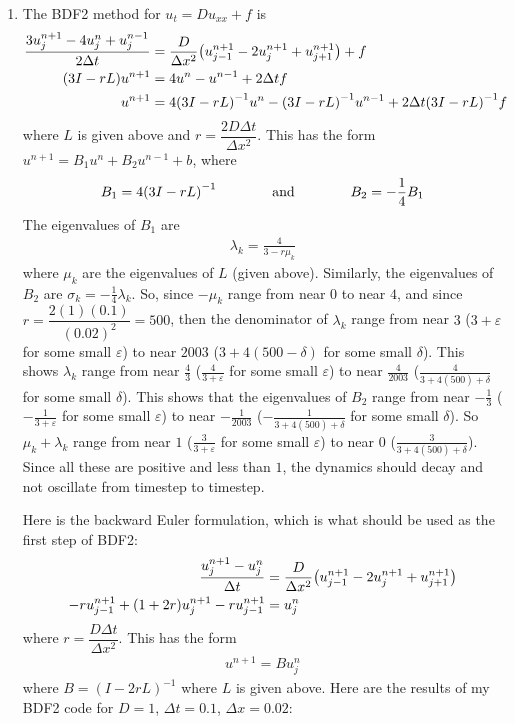 \documentclass{article} %
\theoremstyle{plain}
\newcommand{\E}{\varepsilon}
\newcommand{\Dx}{\Delta x}
\newcommand{\Dt}{\Delta t}
\numberwithin{equation}{section} %
\numberwithin{figure}{section} %
\numberwithin{table}{section} %
\begin{document}
\begin{enumerate}[\ \ (a)]
    \item The BDF2 method for $u_t = Du_{xx} + f$ is
    \begin{align*}
        \frac{3u_j^{n+1} - 4u_j^n + u_j^{n-1}}{2\Dt} &= \frac{D}{\Dx^2}\qty(u_{j-1}^{n+1} - 2u_j^{n+1} + u_{j+1}^{n+1}) + f \\
        \qty(3I - rL)u^{n+1} &= 4u^n - u^{n-1} + 2\Dt f\\
        u^{n+1} &= 4\qty(3I - rL)^{-1}u^n - \qty(3I - rL)^{-1}u^{n-1} + 2\Dt\qty(3I - rL)^{-1}f
    \end{align*}
    where $L$ is given above and $r = \dfrac{2D\Dt}{\Dx^2}$.  This has the form $u^{n+1} = B_1u^n + B_2u^{n-1} + b$, where
    \begin{align*}
        B_1 = 4\qty(3I - rL)^{-1} \qquad\qquad \text{and} \qquad\qquad B_2 = -\frac{1}{4}B_1
    \end{align*}
    The eigenvalues of $B_1$ are
    \begin{align*}
        \lambda_k = \frac{4}{3 - r\mu_k}
    \end{align*}
    where $\mu_k$ are the eigenvalues of $L$ (given above).  Similarly, the eigenvalues of $B_2$ are $\sigma_k = -\frac{1}{4}\lambda_k$.  So, since $-\mu_k$ range from near $0$ to near $4$, and since $r = \dfrac{2(1)(0.1)}{(0.02)^2} = 500$, then the denominator of $\lambda_k$ range from near $3$ ($3 + \E$ for some small $\E$) to near $2003$ ($3 + 4(500 - \delta)$ for some small $\delta$).  This shows $\lambda_k$ range from near $\frac{4}{3}$ ($\frac{4}{3 + \E}$ for some small $\E$) to near $\frac{4}{2003}$ ($\frac{4}{3 + 4(500) + \delta}$ for some small $\delta$).  This shows that the eigenvalues of $B_2$ range from near $-\frac{1}{3}$ ($-\frac{1}{3 + \E}$ for some small $\E$) to near $-\frac{1}{2003}$ ($-\frac{1}{3 + 4(500) + \delta}$ for some small $\delta$).  So $\mu_k + \lambda_k$ range from near $1$ ($\frac{3}{3 + \E}$ for some small $\E$) to near $0$ ($\frac{3}{3 + 4(500) + \delta}$).  Since all these are positive and less than $1$, the dynamics should decay and not oscillate from timestep to timestep.

    Here is the backward Euler formulation, which is what should be used as the first step of BDF2:
    \begin{align}
        \frac{u_j^{n+1} - u_j^n}{\Dt} &= \frac{D}{\Dx^2}\qty(u_{j-1}^{n+1} - 2u_j^{n+1} + u_{j+1}^{n+1}) \\
        -ru_{j-1}^{n+1} + (1 + 2r)u_j^{n+1} - ru_{j-1}^{n+1} &= u_j^n
    \end{align}
    where $r = \dfrac{D\Dt}{\Dx^2}$.  This has the form
    \begin{align}
        u^{n+1} = Bu_j^n
    \end{align}
    where $B = (I - 2rL)^{-1}$ where $L$ is given above.
    Here are the results of my BDF2 code for $D = 1$, $\Dt = 0.1$, $\Dx = 0.02$:


\end{enumerate}
\end{document}

